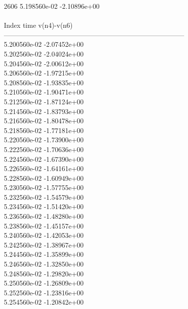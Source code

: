 2606	5.198560e-02	-2.10896e+00	\\ \hline
\\ \hline
Index   time            v(n4)-v(n6)     \\ \hline
--------------------------------------------------------------------------------\\ 	5.200560e-02	-2.07452e+00	\\ 	5.202560e-02	-2.04024e+00	\\ 	5.204560e-02	-2.00612e+00	\\ 	5.206560e-02	-1.97215e+00	\\ 	5.208560e-02	-1.93835e+00	\\ 	5.210560e-02	-1.90471e+00	\\ 	5.212560e-02	-1.87124e+00	\\ 	5.214560e-02	-1.83793e+00	\\ 	5.216560e-02	-1.80478e+00	\\ 	5.218560e-02	-1.77181e+00	\\ 	5.220560e-02	-1.73900e+00	\\ 	5.222560e-02	-1.70636e+00	\\ 	5.224560e-02	-1.67390e+00	\\ 	5.226560e-02	-1.64161e+00	\\ 	5.228560e-02	-1.60949e+00	\\ 	5.230560e-02	-1.57755e+00	\\ 	5.232560e-02	-1.54579e+00	\\ 	5.234560e-02	-1.51420e+00	\\ 	5.236560e-02	-1.48280e+00	\\ 	5.238560e-02	-1.45157e+00	\\ 	5.240560e-02	-1.42053e+00	\\ 	5.242560e-02	-1.38967e+00	\\ 	5.244560e-02	-1.35899e+00	\\ 	5.246560e-02	-1.32850e+00	\\ 	5.248560e-02	-1.29820e+00	\\ 	5.250560e-02	-1.26809e+00	\\ 	5.252560e-02	-1.23816e+00	\\ 	5.254560e-02	-1.20842e+00	\\ \hline
